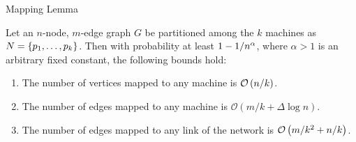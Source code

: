 \begin{frame}{Mapping Lemma}
    \begin{lemma}\label{lem:more-acc-mapping-lemma}
        Let an \(n\)-node, \(m\)-edge graph \(G\) be partitioned among the \(k\)
        machines as \(N = \left\{p_1, \ldots, p_k\right\}\). Then with probability at
        least \(1 - 1 / n^\alpha\), where \(\alpha > 1\) is an arbitrary
        fixed constant, the following bounds hold:
        \begin{enumerate}
            \item The number of vertices mapped to any machine is \(\mathcal{O}\left(n/k\right)\).
            \item The number of edges mapped to any machine is \(\mathcal{O}(m/k + \Delta \log n)\).
            \item The number of edges mapped to any link of the network is \(\mathcal{O}\left(m/k^2 + n/k\right)\).
        \end{enumerate}
    \end{lemma}
\end{frame}